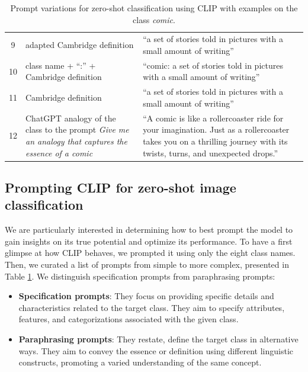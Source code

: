 \begin{table}[ht]
\begin{tabular}{c p{7cm} p{7cm}}
        \rowcolor{lightgreen} 9 & adapted Cambridge definition & “a set of stories told in pictures with a small amount of writing” \\
        \rowcolor{lightgreen} 10 & class name + “:” + Cambridge definition & “comic: a set of stories told in pictures with a small amount of writing” \\
        \rowcolor{lightgreen} 11 & Cambridge definition & “a set of stories told in pictures with a small amount of writing” \\
        \rowcolor{lightgreen} 12 & ChatGPT analogy of the class to the prompt \textit{Give me an analogy that captures the essence of a comic} & “A comic is like a rollercoaster ride for your imagination. Just as a rollercoaster takes you on a thrilling journey with its twists, turns, and unexpected drops.” \\
    \end{tabular}
    \caption{Prompt variations for zero-shot classification using CLIP with examples on the class \textit{comic}.}
    \label{tab:prompt_variations}
\end{table}


\subsection{Prompting CLIP for zero-shot image classification}

We are particularly interested in determining how to best prompt the model to gain insights on its true potential and optimize its performance. To have a first glimpse at how CLIP behaves, we prompted it using only the eight class names. Then, we curated a list of prompts from simple to more complex, presented in Table \ref{tab:prompt_variations}. We distinguish specification prompts from paraphrasing prompts:

\begin{itemize}
    \item \textbf{Specification prompts}: They focus on providing specific details and characteristics related to the target class. They aim to specify attributes, features, and categorizations associated with the given class.
    \item \textbf{Paraphrasing prompts}: They restate, define the target class in alternative ways. They aim to convey the essence or definition using different linguistic constructs, promoting a varied understanding of the same concept.
\end{itemize}


